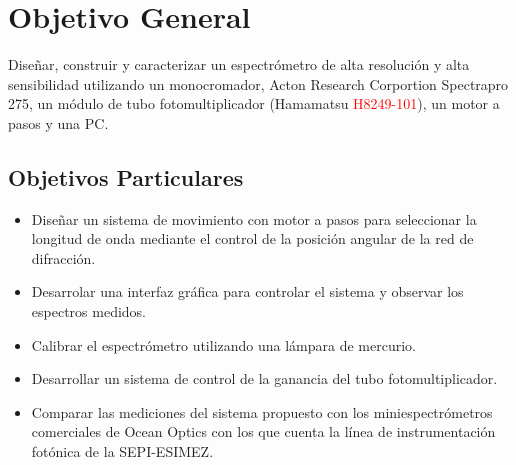 \chapter*{Objetivo General}
Diseñar, construir y caracterizar un espectrómetro de alta resolución y alta sensibilidad utilizando un monocromador, Acton Research Corportion Spectrapro 275,  un módulo de tubo fotomultiplicador (Hamamatsu \textcolor{red}{H8249-101}), un motor a pasos y una PC.
\section*{Objetivos Particulares}
\begin{itemize}
\item Diseñar un sistema de movimiento con motor a pasos para seleccionar la longitud de onda mediante el control de la posición angular de la red de difracción.

\item Desarrolar una interfaz gráfica para controlar el sistema y observar los espectros medidos.

\item Calibrar el espectrómetro utilizando una lámpara de mercurio.

\item Desarrollar un sistema de control de la ganancia del tubo fotomultiplicador.

\item Comparar las mediciones del sistema propuesto con los miniespectrómetros comerciales de Ocean Optics con los que cuenta la línea de instrumentación fotónica de la SEPI-ESIMEZ.
\end{itemize}
